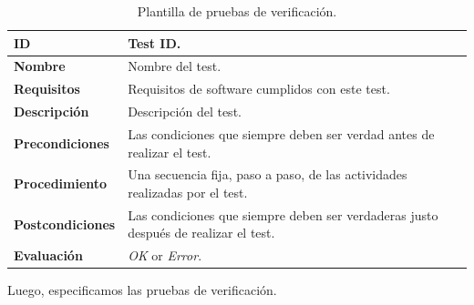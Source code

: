 \begin{center}
\begin{table}[htb]
\centering
\begin{tabular}{@{}p{2.5cm} p{9cm}@{}} 
\toprule
\textbf{ID} 					& Test ID. \\
\midrule
\textbf{Nombre} 				& Nombre del test. \\
\midrule
\textbf{Requisitos} 		& Requisitos de software cumplidos con este test. \\
\midrule
\textbf{Descripción} 		& Descripción del test. \\
\midrule
\textbf{Precondiciones}		& Las condiciones que siempre deben ser verdad antes de realizar el test. \\
\midrule
\textbf{Procedimiento}			& Una secuencia fija, paso a paso, de las actividades realizadas por el test. \\
\midrule
\textbf{Postcondiciones} 		& Las condiciones que siempre deben ser verdaderas justo después de realizar el test. \\
\midrule
\textbf{Evaluación} 			& \textit{OK} or \textit{Error}. \\
\bottomrule
\end{tabular}
\caption{Plantilla de pruebas de verificación.}
\label{tab:verification_tests}
\end{table}
\end{center}

Luego, especificamos las pruebas de verificación.

\vspace{0.7cm}

